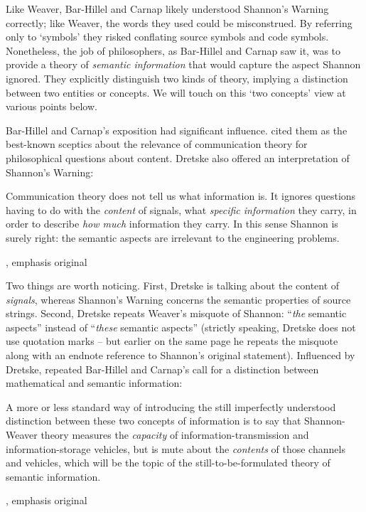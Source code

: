 \documentclass[12pt]{article}
\begin{document}
\noindent Like Weaver, Bar-Hillel and Carnap likely understood {\sc Shannon's Warning} correctly; like Weaver, the words they used could be misconstrued.
By referring only to `symbols' they risked conflating source symbols and code symbols.
Nonetheless, the job of philosophers, as Bar-Hillel and Carnap saw it, was to provide a theory of \textit{semantic information} that would capture the aspect Shannon ignored.
They explicitly distinguish two kinds of theory, implying a distinction between two entities or concepts.
We will touch on this `two concepts' view at various points below.

Bar-Hillel and Carnap's exposition had significant influence.
\citet[p. 241, n.
1]{dretske1981knowledge} cited them as the best-known sceptics about the relevance of communication theory for philosophical questions about content.
Dretske also offered an interpretation of {\sc Shannon's Warning}:

\begin{myquote}
Communication theory does not tell us what information is.
It ignores questions having to do with the \emph{content} of signals, what \emph{specific information} they carry, in order to describe \emph{how much} information they carry.
In this sense Shannon is surely right: the semantic aspects are irrelevant to the engineering problems.
\par\hspace*{\fill}\citet[41]{dretske1981knowledge}, emphasis original
\end{myquote}

\noindent Two things are worth noticing.
First, Dretske is talking about the content of \textit{signals}, whereas {\sc Shannon's Warning} concerns the semantic properties of source strings.
Second, Dretske repeats Weaver's misquote of Shannon: ``\textit{the} semantic aspects'' instead of ``\textit{these} semantic aspects'' (strictly speaking, Dretske does not use quotation marks -- but earlier on the same page he repeats the misquote along with an endnote reference to Shannon's original statement).
Influenced by Dretske, \citet{dennett1983intentional} repeated Bar-Hillel and Carnap's call for a distinction between mathematical and semantic information:

\begin{myquote}
A more or less standard way of introducing the still imperfectly understood distinction between these two concepts of information is to say that Shannon-Weaver theory measures the \emph{capacity} of information-transmission and information-storage vehicles, but is mute about the \emph{contents} of those channels and vehicles, which will be the topic of the still-to-be-formulated theory of semantic information.
\par\hspace*{\fill}\citet[344]{dennett1983intentional}, emphasis original
\end{myquote}
\end{document}
